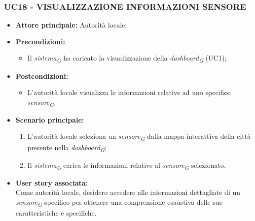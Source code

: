 \subsubsection{UC18 - VISUALIZZAZIONE INFORMAZIONI SENSORE}
\begin{itemize}
    \item \textbf{Attore principale:} Autorità locale;
    \item \textbf{Precondizioni:}
        \begin{itemize}
            \item Il \textit{sistema}\textsubscript{\textit{G}} ha caricato la visualizzazione della \textit{dashboard}\textsubscript{\textit{G}} (UC1);
        \end{itemize}
    \item \textbf{Postcondizioni:}
        \begin{itemize}
            \item L'autorità locale visualizza le informazioni relative ad uno specifico \textit{sensore}\textsubscript{\textit{G}}.
        \end{itemize}
    \item \textbf{Scenario principale:}
        \begin{enumerate}
            \item L'autorità locale seleziona un \textit{sensore}\textsubscript{\textit{G}} dalla mappa interattiva della città presente nella \textit{dashboard}\textsubscript{\textit{G}};
            \item Il \textit{sistema}\textsubscript{\textit{G}} carica le informazioni relative al \textit{sensore}\textsubscript{\textit{G}} selezionato.
        \end{enumerate}
    \item \textbf{User story associata:} \\
        Come autorità locale, desidero accedere alle informazioni dettagliate di un \textit{sensore}\textsubscript{\textit{G}} specifico per ottenere una comprensione esaustiva delle sue caratteristiche e specifiche.
\end{itemize}